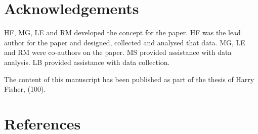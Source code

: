 \documentclass[
  english,
  man]{apa6}
\begin{document}
\hypertarget{acknowledgements}{%
\section{Acknowledgements}\label{acknowledgements}}

HF, MG, LE and RM developed the concept for the paper. HF was the lead author for the paper and designed, collected and analysed that data. MG, LE and RM were co-authors on the paper. MS provided assistance with data analysis. LB provided assistance with data collection.

The content of this manuscript has been published as part of the thesis of Harry Fisher, (100).

\hypertarget{references}{%
\section{References}\label{references}}

\begingroup
\setlength{\parindent}{-0.5in}
\setlength{\leftskip}{0.5in}
\end{document}

